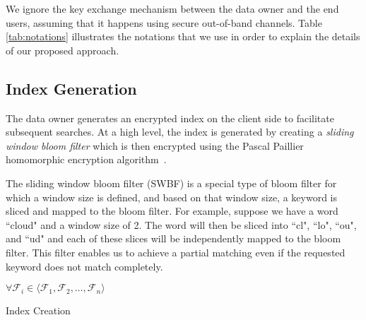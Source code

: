 We ignore the key exchange mechanism between the data owner and the end users, assuming
that it happens using secure out-of-band channels.
Table \ref{tab:notations} illustrates the notations that we use in order to explain
the details of our proposed approach.


\subsection{Index Generation}

The data owner generates an encrypted index on the client side to facilitate
subsequent searches. At a high level, the index is generated by creating a 
\textit{sliding window bloom filter} which is then encrypted using the Pascal Paillier
homomorphic encryption algorithm~\cite{pascal}. 

The sliding window bloom filter (SWBF) is a special type of bloom filter
for which a window size is defined, and based on that
window size, a keyword is sliced and mapped to the bloom filter. For example,
suppose we have a word ``cloud" and a window size of 2. The word will then be
sliced into ``cl", ``lo", ``ou", and ``ud" and each of these slices will be 
independently mapped to the bloom filter. This filter enables us to achieve
 a partial matching even if the requested keyword does not match
 completely.

\begin{algorithm}[b!]
$ \forall \mathcal{F}_i \in \langle \mathcal{F}_1, \mathcal{F}_2, \ldots,
\mathcal{F}_n \rangle$\;
\;
 \caption{Index Creation}
 \label{algo:IndexCreation}
\end{algorithm}

